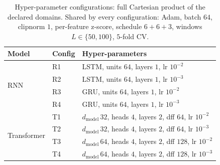 \begin{table}[t]\centering
\caption{Hyper-parameter configurations: full Cartesian product of the declared domains. Shared by every configuration: Adam, batch $64$, clipnorm $1$, per-feature z-score, schedule $6{+}6{+}3$, windows $L\in\{50,100\}$, $5$-fold CV.}
\label{tab:hpcfg}
\begin{tabular}{lll}
\toprule
Model & Config & Hyper-parameters \\
\midrule
\multirow{4}{*}{RNN} & R1 & LSTM, units $64$, layers $1$, lr $10^{-2}$ \\
 & R2 & LSTM, units $64$, layers $1$, lr $10^{-3}$ \\
 & R3 & GRU, units $64$, layers $1$, lr $10^{-2}$ \\
 & R4 & GRU, units $64$, layers $1$, lr $10^{-3}$ \\
\midrule
\multirow{4}{*}{Transformer} & T1 & $d_{\text{model}}\,32$, heads $4$, layers $2$, dff $64$, lr $10^{-2}$ \\
 & T2 & $d_{\text{model}}\,32$, heads $4$, layers $2$, dff $64$, lr $10^{-3}$ \\
 & T3 & $d_{\text{model}}\,64$, heads $4$, layers $2$, dff $128$, lr $10^{-2}$ \\
 & T4 & $d_{\text{model}}\,64$, heads $4$, layers $2$, dff $128$, lr $10^{-3}$ \\
\bottomrule
\end{tabular}
\end{table}